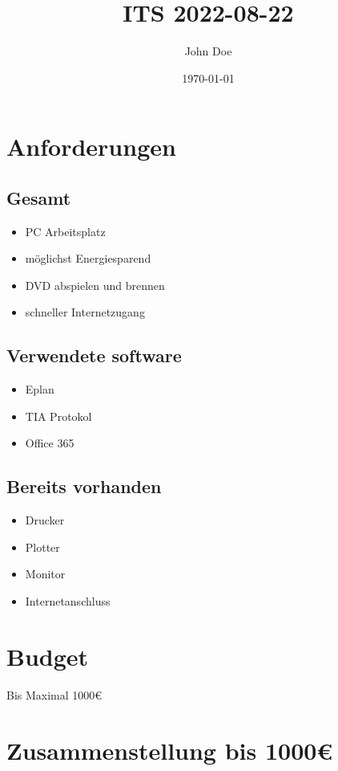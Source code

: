 \documentclass[11pt]{article}
\author{John Doe}
\date{\today}
\title{ITS 2022-08-22}
\begin{document}
\maketitle
\tableofcontents

\section{Anforderungen}
\label{sec:org07f88d4}
\subsection{Gesamt}
\label{sec:org6cd9ad3}
\begin{itemize}
\item PC Arbeitsplatz
\item möglichst Energiesparend
\item DVD abspielen und brennen
\item schneller Internetzugang
\end{itemize}

\subsection{Verwendete software}
\label{sec:org541b54b}
\begin{itemize}
\item Eplan
\item TIA Protokol
\item Office 365
\end{itemize}

\subsection{Bereits vorhanden}
\label{sec:orgc9a3e28}
\begin{itemize}
\item Drucker
\item Plotter
\item Monitor
\item Internetanschluss
\end{itemize}




\section{Budget}
\label{sec:orged45362}
Bis Maximal 1000€
\section{Zusammenstellung bis 1000€}
\label{sec:org615a609}
\end{document}
